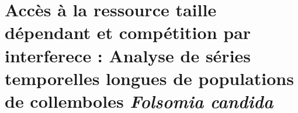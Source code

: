 \chapter[SP]{Accès à la ressource taille dépendant et compétition par interferece : Analyse de séries temporelles longues de populations de collemboles \textit{Folsomia candida}}
\label{chap:sp}

